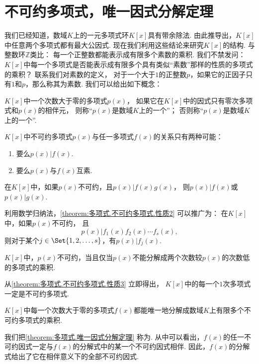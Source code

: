 \section{不可约多项式，唯一因式分解定理}
我们已经知道，数域\(K\)上的一元多项式环\(K[x]\)具有带余除法.
由此推导出，\(K[x]\)中任意两个多项式都有最大公因式.
现在我们利用这些结论来研究\(K[x]\)的结构.
与整数环\(\mathbb{Z}\)类比：
每一个正整数都能表示成有限多个素数的乘积.
我们不禁发问：\(K[x]\)中每一个多项式是否能表示成有限多个具有类似“素数”那样的性质的多项式的乘积？
联系我们对素数的定义，
对于一个大于\(1\)的正整数\(p\)，如果它的正因子只有\(1\)和\(p\)，那么称其为素数.
我们可以给出如下概念：
\begin{definition}
\(K[x]\)中一个次数大于零的多项式\(p(x)\)，
如果它在\(K[x]\)中的因式只有零次多项式和\(p(x)\)的相伴元，
则称“\(p(x)\)是数域\(K\)上的一个”；
否则称“\(p(x)\)是数域\(K\)上的一个”.
\end{definition}

\begin{property}%
\(K[x]\)中不可约多项式\(p(x)\)与任一多项式\(f(x)\)的关系只有两种可能：
\begin{enumerate}
	\item 要么\(p(x) \vert f(x)\).
	\item 要么\(p(x)\)与\(f(x)\)互素.
\end{enumerate}
\end{property}

\begin{property}\label{theorem:多项式.不可约多项式.性质2}
在\(K[x]\)中，如果\(p(x)\)不可约，且\(p(x) \vert f(x) g(x)\)，
则\(p(x) \vert f(x)\)或\(p(x) \vert g(x)\).
\end{property}

利用数学归纳法，\cref{theorem:多项式.不可约多项式.性质2} 可以推广为：
在\(K[x]\)中，如果\(p(x)\)不可约，
且\[
	p(x) \vert f_1(x) f_2(x) \dotsm f_s(x),
\]
则对于某个\(j \in \Set{1,2,\dotsc,s}\)，有\(p(x) \vert f_j(x)\).

\begin{property}\label{theorem:多项式.不可约多项式.性质3}
\(K[x]\)中，\(p(x)\)不可约，当且仅当\(p(x)\)不能分解成两个次数较\(p(x)\)的次数低的多项式的乘积.
\end{property}

从\cref{theorem:多项式.不可约多项式.性质3} 立即得出，
\(K[x]\)中的每一个\(1\)次多项式一定是不可约多项式.

\begin{theorem}\label{theorem:多项式.唯一因式分解定理}
\(K[x]\)中每一个次数大于零的多项式\(f(x)\)都能唯一地分解成数域\(K\)上有限多个不可约多项式的乘积.
\end{theorem}

我们把\cref{theorem:多项式.唯一因式分解定理} 称为.
从中可以看出，\(f(x)\)的任一不可约因式一定与\(f(x)\)的分解式中的某一个不可约因式相伴.
因此，\(f(x)\)的分解式给出了它在相伴意义下的全部不可约因式.
